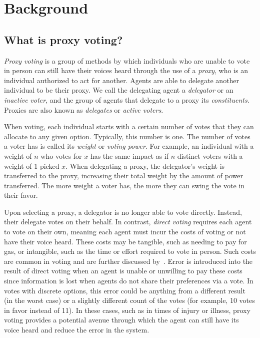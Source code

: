 \section{Background}\label{sec:background}

\subsection{What is proxy voting?}\label{subsec:what-is-proxy-voting?}
\textit{Proxy voting} is a group of methods by which individuals who are unable to
vote in person can still have their voices heard through the use of a \textit{proxy},
who is an individual authorized to act for another.
Agents are able to delegate another individual to be their proxy.
We call the delegating agent a \textit{delegator} or an \textit{inactive voter}, and
the group of agents that delegate to a proxy its \textit{constituents}.
Proxies are also known as \textit{delegates} or \textit{active voters}.

When voting, each individual starts with a certain number of votes that they can
allocate to any given option.
Typically, this number is one.
The number of votes a voter has is called its \textit{weight} or \textit{voting power}.
For example, an individual with a weight of $n$ who votes for $x$ has the same impact
as if $n$ distinct voters with a weight of 1 picked $x$.
When delegating a proxy, the delegator's weight is transferred to the proxy,
increasing their total weight by the amount of power transferred.
The more weight a voter has, the more they can swing the vote in their favor.

Upon selecting a proxy, a delegator is no longer able to vote directly.
Instead, their delegate votes on their behalf.
In contrast, \textit{direct voting} requires each agent to vote on their own, meaning
each agent must incur the costs of voting or not have their voice heard.
These costs may be tangible, such as needing to pay for gas, or intangible, such as
the time or effort required to vote in person.
Such costs are common in voting and are further discussed by~\cite{Gershtein2019}.
Error is introduced into the result of direct voting when an agent is unable or
unwilling to pay these costs since information is lost when agents do not share
their preferences via a vote.
In votes with discrete options, this error could be anything from a different result
(in the worst case) or a slightly different count of the votes (for example, 10
votes in favor instead of 11).
In these cases, such as in times of injury or illness, proxy voting provides a
potential avenue through which the agent can still have its voice heard and reduce
the error in the system.

